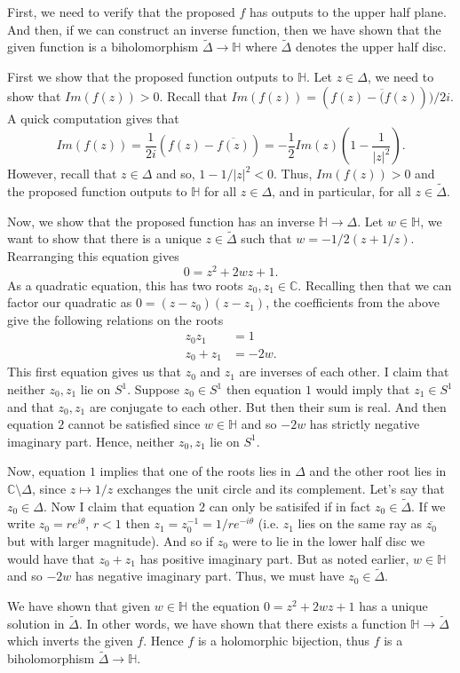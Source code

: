 \documentclass[12pt,letterpaper,boxed]{hmcpset}
\newcommand{\C}{\mathbb C}
\newcommand{\abssq}[1]{\left|#1\right|^2}
\begin{document}
\begin{solution}
First, we need to verify that the proposed $f$ has outputs to the
upper half plane. And then, if we can construct an inverse function,
then we have shown that the given function is a biholomorphism $\tilde
\Delta \to \mathbb H$ where $\tilde \Delta$ denotes the upper half disc. 

First we show that the proposed function outputs to $\mathbb H$.
Let $z \in \Delta$, we need to show that $Im(f(z)) > 0$.
Recall that $Im(f(z)) = (f(z) - \overline(f(z))) / 2i$. 
A quick computation gives that 
\[
	Im(f(z)) = 
	\frac{1}{2i}\left(f(z) - \overline{f(z)}\right) = -\frac{1}{2} Im(z) \left(1 - \frac{1}{\abssq{z}}\right). 
\]
However, recall that $z \in \Delta$ and so, $1 - 1/\abssq{z} < 0$.
Thus, $Im(f(z)) > 0$ and the proposed function outputs to $\mathbb H$
for all $z \in \Delta$, and in particular, for all $z \in \tilde
\Delta$. 

Now, we show that the proposed function has an inverse $\mathbb H \to
\Delta$. 
Let $w \in \mathbb H$, we want to show that there is a unique $z \in
\tilde \Delta$ such that $w = -1/2(z + 1/z)$. Rearranging this equation
gives 
\[
	0 = z^2 + 2wz + 1. 
\]
As a quadratic equation, this has two roots $z_0, z_1 \in \C$. 
Recalling then that we can factor our quadratic as $0 = (z -z_0)(z-z_1)$, 
the coefficients from the above give the following relations on
the roots
\begin{align}
	z_0 z_1 &= 1 \\
	z_0 + z_1 &= -2w. 
\end{align}
This first equation gives us that $z_0$ and $z_1$ are inverses of each
other. I claim that neither $z_0, z_1$ lie on $S^1$. Suppose $z_0 \in
S^1$ then equation $1$ would imply that $z_1 \in S^1$ and that $z_0,
z_1$ are conjugate to each other. But then their sum is real. And then
equation $2$ cannot be satisfied since $w \in \mathbb H$ and so $-2w$
has strictly negative imaginary part. Hence, neither $z_0, z_1$ lie on
$S^1$. 

Now, equation $1$ implies that one of the roots lies in $\Delta$ and
the other root lies in $\mathbb C \setminus \Delta$, since $z \mapsto
1/z$ exchanges the unit circle and its complement. Let's say that $z_0
\in \Delta$. 
Now I claim that equation $2$ can only be satisifed if in fact $z_0
\in \tilde \Delta$. 
If we write $z_0 = r e^{i \theta}$, $r < 1$ then $z_1 = z_0^{-1} =
1/r e^{-i \theta}$ (i.e. $z_1$ lies on the same ray as
$\overline{z_0}$ but with larger magnitude). And so if $z_0$ were to
lie in the lower half disc we would have that $z_0 + z_1$ has positive
imaginary part. But as noted earlier, $w \in \mathbb H$ and so $-2w$
has negative imaginary part. Thus, we must have $z_0 \in \tilde
\Delta$.


We have shown that given $w \in \mathbb H$ the equation $0 = z^2 + 2wz
+ 1$ has a unique solution in $\tilde \Delta$. In other words, 
we have shown that there exists a function $\mathbb H \to \tilde
\Delta$ which inverts the given $f$. Hence $f$ is a holomorphic
bijection, thus $f$ is a biholomorphism $\tilde \Delta \to \mathbb H$. 

\end{solution}

\newpage
\end{document}
